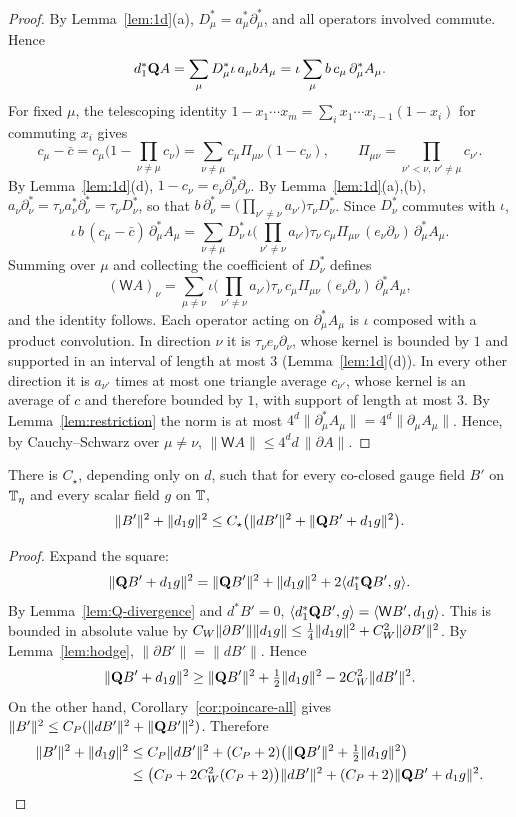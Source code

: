 \begin{proof}
By Lemma~\ref{lem:1d}(a), $D_\mu^*=a_\mu^*\partial_\mu^*$, and all operators involved commute. Hence
\[
d_1^*\mathbf Q A=\sum_\mu D_\mu^*\iota\,a_\mu bA_\mu=\iota\sum_\mu b\,c_\mu\,\partial_\mu^*A_\mu .
\]
For fixed $\mu$, the telescoping identity $1-x_1\cdots x_m=\sum_ix_1\cdots x_{i-1}(1-x_i)$ for commuting $x_i$ gives
\[
c_\mu-\bar c=c_\mu\Big(1-\prod_{\nu\ne\mu}c_\nu\Big)=\sum_{\nu\ne\mu}c_\mu\Pi_{\mu\nu}(1-c_\nu),\qquad\Pi_{\mu\nu}=\prod_{\nu'<\nu,\ \nu'\ne\mu}c_{\nu'} .
\]
By Lemma~\ref{lem:1d}(d), $1-c_\nu=e_\nu\partial_\nu^*\partial_\nu$. By Lemma~\ref{lem:1d}(a),(b), $a_\nu\partial_\nu^*=\tau_\nu a_\nu^*\partial_\nu^*=\tau_\nu D_\nu^*$, so that $b\,\partial^*_\nu=\big(\prod_{\nu'\ne\nu}a_{\nu'}\big)\tau_\nu D^*_\nu$. Since $D^*_\nu$ commutes with $\iota$,
\[
\iota\,b\,(c_\mu-\bar c)\,\partial^*_\mu A_\mu=\sum_{\nu\ne\mu}D_\nu^*\,\iota\Big(\prod_{\nu'\ne\nu}a_{\nu'}\Big)\tau_\nu\,c_\mu\Pi_{\mu\nu}\,(e_\nu\partial_\nu)\,\partial^*_\mu A_\mu .
\]
Summing over $\mu$ and collecting the coefficient of $D^*_\nu$ defines
\[
(\mathsf WA)_\nu=\sum_{\mu\ne\nu}\iota\Big(\prod_{\nu'\ne\nu}a_{\nu'}\Big)\tau_\nu\,c_\mu\Pi_{\mu\nu}\,(e_\nu\partial_\nu)\,\partial^*_\mu A_\mu,
\]
and the identity follows. Each operator acting on $\partial^*_\mu A_\mu$ is $\iota$ composed with a product convolution. In direction $\nu$ it is $\tau_\nu e_\nu\partial_\nu$, whose kernel is bounded by $1$ and supported in an interval of length at most $3$ (Lemma~\ref{lem:1d}(d)). In every other direction it is $a_{\nu'}$ times at most one triangle average $c_{\nu'}$, whose kernel is an average of $c$ and therefore bounded by $1$, with support of length at most $3$. By Lemma~\ref{lem:restriction} the norm is at most $4^d\|\partial^*_\mu A_\mu\|=4^d\|\partial_\mu A_\mu\|$. Hence, by Cauchy--Schwarz over $\mu\ne\nu$, $\|\mathsf WA\|\le4^d d\,\|\partial A\|$.
\end{proof}

\begin{lemma}[Separation]\label{lem:separation}
There is $C_\star$, depending only on $d$, such that for every co-closed gauge field $B'$ on $\mathbb T_\eta$ and every scalar field $g$ on $\mathbb T$,
\[
\|B'\|^2+\|d_1 g\|^2\le C_\star\big(\|dB'\|^2+\|\mathbf Q B'+d_1 g\|^2\big).
\]
\end{lemma}

\begin{proof}
Expand the square:
\[
\|\mathbf Q B'+d_1 g\|^2=\|\mathbf Q B'\|^2+\|d_1 g\|^2+2\langle d_1^*\mathbf Q B',g\rangle .
\]
By Lemma~\ref{lem:Q-divergence} and $d^*B'=0$, $\langle d_1^*\mathbf Q B',g\rangle=\langle \mathsf WB',d_1 g\rangle$. This is bounded in absolute value by $C_W\|\partial B'\|\|d_1 g\|\le\frac14\|d_1 g\|^2+C_W^2\|\partial B'\|^2$. By Lemma~\ref{lem:hodge}, $\|\partial B'\|=\|dB'\|$. Hence
\[
\|\mathbf Q B'+d_1 g\|^2\ge\|\mathbf Q B'\|^2+\tfrac12\|d_1 g\|^2-2C_W^2\|dB'\|^2 .
\]
On the other hand, Corollary~\ref{cor:poincare-all} gives $\|B'\|^2\le C_P(\|dB'\|^2+\|\mathbf Q B'\|^2)$. Therefore
\begin{align*}
\|B'\|^2+\|d_1 g\|^2&\le C_P\|dB'\|^2+(C_P+2)\big(\|\mathbf Q B'\|^2+\tfrac12\|d_1 g\|^2\big)\\
&\le\big(C_P+2C_W^2(C_P+2)\big)\|dB'\|^2+(C_P+2)\|\mathbf Q B'+d_1 g\|^2 . \qedhere
\end{align*}
\end{proof}

